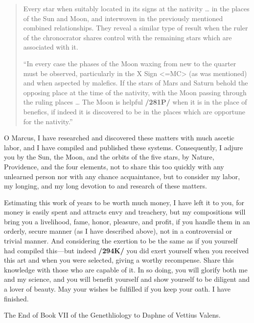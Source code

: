 \begin{quote}
Every star when suitably located in its signs at the nativity … in the places of the Sun and Moon, and interwoven in the previously mentioned combined relationships. They reveal a similar type of result when the ruler of the chronocrator shares control with the remaining
stars which are associated with it.

“In every case the phases of the Moon waxing from new to the quarter must be observed, particularly in the X Sign <=MC> (as was mentioned) and when aspected by malefics. If the stars of
Mars and Saturn behold the opposing place at the time of the nativity, with the Moon passing through the ruling places … The Moon is helpful \textbf{/281P/} when it is in the place of benefics, if indeed
it is discovered to be in the places which are opportune for the nativity.”
\end{quote}

O Marcus, I have researched and discovered these matters with much ascetic labor, and I have compiled and published these systems. Consequently, I adjure you by the Sun, the Moon, and the orbits of the five stars, by Nature, Providence, and the four elements, not to share this too quickly with any unlearned person nor with any chance acquaintance, but to consider my labor, my longing, and my long devotion to and research of these matters. 

Estimating this work of years to be worth much money, I have left it to you, for money is easily spent and attracts envy and treachery, but my compositions will bring you a livelihood, fame, honor, pleasure, and profit, if you handle them in an orderly, secure manner (as I have described above), not in a controversial or trivial manner. And considering the exertion to be the same as if you yourself had compiled this—but indeed \textbf{/294K/} you did exert yourself when you received this art and when you were selected, giving a worthy recompense. Share this knowledge with those who are capable of it. In so doing, you will glorify both me and my science, and you will benefit yourself and show yourself to be diligent and a lover of beauty.
May your wishes be fulfilled if you keep your oath. I have finished.

The End of Book VII of the Genethliology to Daphne of Vettius Valens.

\newpage